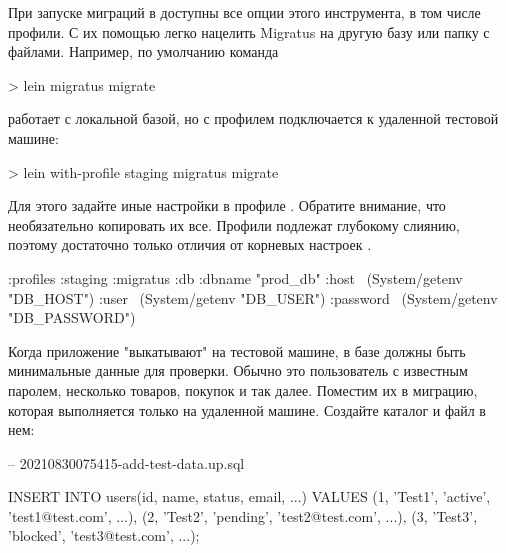 При запуске миграций в  доступны все опции этого инструмента, в том числе профили. С их помощью легко нацелить Migratus на другую базу или папку с файлами. Например, по умолчанию команда

\begin{english}
  \begin{bash}
> lein migratus migrate
  \end{bash}
\end{english}

работает с локальной базой, но с профилем  подключается к удаленной тестовой машине:

\begin{english}
  \begin{bash}
> lein with-profile staging migratus migrate
  \end{bash}
\end{english}

Для этого задайте иные настройки  в профиле . Обратите внимание, что необязательно копировать их все. Профили  подлежат глубокому слиянию, поэтому достаточно только отличия от корневых настроек .

\begin{english}
  \begin{clojure}
{:profiles
 {:staging
  {:migratus
   {:db {:dbname "prod_db"
         :host ~(System/getenv "DB_HOST")
         :user ~(System/getenv "DB_USER")
         :password ~(System/getenv "DB_PASSWORD")}}}}}
  \end{clojure}
\end{english}

Когда приложение "выкатывают" на тестовой машине, в базе должны быть минимальные данные для проверки. Обычно это пользователь с известным паролем, несколько товаров, покупок и так далее. Поместим их в миграцию, которая выполняется только на удаленной машине. Создайте каталог  и файл в нем:

\begin{english}
  \begin{sql}
-- 20210830075415-add-test-data.up.sql

INSERT INTO users(id, name, status, email, ...)
VALUES
 (1, 'Test1', 'active',  'test1@test.com', ...),
 (2, 'Test2', 'pending', 'test2@test.com', ...),
 (3, 'Test3', 'blocked', 'test3@test.com', ...);
  \end{sql}
\end{english}


